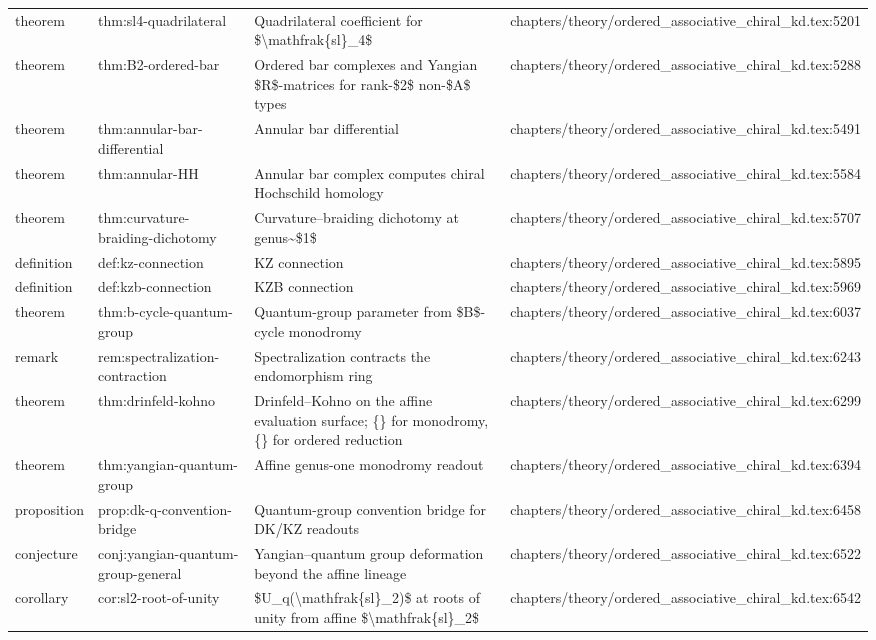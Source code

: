 \documentclass[11pt]{article}
\begin{document}
\begin{longtable}{L{0.10\textwidth}L{0.26\textwidth}L{0.42\textwidth}L{0.22\textwidth}}
theorem & thm:sl4-quadrilateral & Quadrilateral coefficient for \$\textbackslash{}mathfrak\{sl\}\_4\$ & chapters/theory/ordered\_associative\_chiral\_kd.tex:5201\\
theorem & thm:B2-ordered-bar & Ordered bar complexes and Yangian \$R\$-matrices for rank-\$2\$ non-\$A\$ types & chapters/theory/ordered\_associative\_chiral\_kd.tex:5288\\
theorem & thm:annular-bar-differential & Annular bar differential & chapters/theory/ordered\_associative\_chiral\_kd.tex:5491\\
theorem & thm:annular-HH & Annular bar complex computes chiral Hochschild homology & chapters/theory/ordered\_associative\_chiral\_kd.tex:5584\\
theorem & thm:curvature-braiding-dichotomy & Curvature--braiding dichotomy at genus\textasciitilde{}\$1\$ & chapters/theory/ordered\_associative\_chiral\_kd.tex:5707\\
definition & def:kz-connection & KZ connection & chapters/theory/ordered\_associative\_chiral\_kd.tex:5895\\
definition & def:kzb-connection & KZB connection & chapters/theory/ordered\_associative\_chiral\_kd.tex:5969\\
theorem & thm:b-cycle-quantum-group & Quantum-group parameter from \$B\$-cycle monodromy & chapters/theory/ordered\_associative\_chiral\_kd.tex:6037\\
remark & rem:spectralization-contraction & Spectralization contracts the endomorphism ring & chapters/theory/ordered\_associative\_chiral\_kd.tex:6243\\
theorem & thm:drinfeld-kohno & Drinfeld--Kohno on the affine evaluation surface; \{\} for monodromy, \{\} for ordered reduction & chapters/theory/ordered\_associative\_chiral\_kd.tex:6299\\
theorem & thm:yangian-quantum-group & Affine genus-one monodromy readout & chapters/theory/ordered\_associative\_chiral\_kd.tex:6394\\
proposition & prop:dk-q-convention-bridge & Quantum-group convention bridge for DK/KZ readouts & chapters/theory/ordered\_associative\_chiral\_kd.tex:6458\\
conjecture & conj:yangian-quantum-group-general & Yangian--quantum group deformation beyond the affine lineage & chapters/theory/ordered\_associative\_chiral\_kd.tex:6522\\
corollary & cor:sl2-root-of-unity & \$U\_q(\textbackslash{}mathfrak\{sl\}\_2)\$ at roots of unity from affine \$\textbackslash{}mathfrak\{sl\}\_2\$ & chapters/theory/ordered\_associative\_chiral\_kd.tex:6542\\

\end{longtable}
\end{document}
